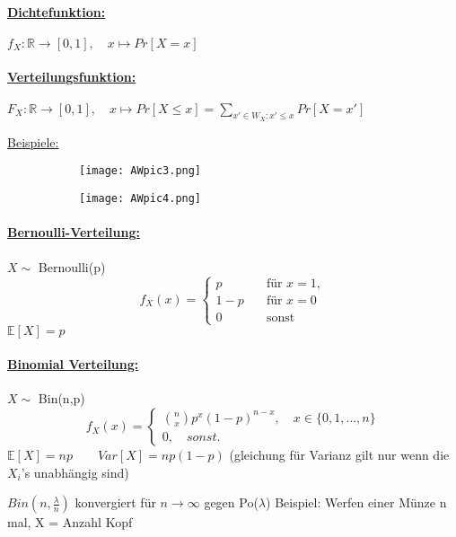 \documentclass[8pt]{extreport}
\begin{document}
 \paragraph{\underline{Dichtefunktion:}}
\begin{center}
$f_X:\mathbb{R} \rightarrow [0,1], \quad x \mapsto Pr[X = x]$
\end{center}
\paragraph{\underline{Verteilungsfunktion:}}
\begin{center}
$F_X : \mathbb{R} \rightarrow [0,1], \quad x \mapsto Pr[X \leq x] = \displaystyle\sum_{x' \in W_{X}: x' \leq x} Pr[X = x']$
\end{center}
\underline{Beispiele:}
\begin{figure}[h!]
	\centering
	\begin{subfigure}[b]{0.4\linewidth}
	\texttt{[image: AWpic3.png]}
	\caption{}
	\label{ziehungsmoglichkeiten}
	\end{subfigure}
	\begin{subfigure}[b]{0.4\linewidth}
	\texttt{[image: AWpic4.png]}
	\caption{}
	\label{ziehungsmoglichkeiten}
	\end{subfigure}

\end{figure}
\newpage

\paragraph{\underline{Bernoulli-Verteilung:}}
\begin{center}
$X \sim$ Bernoulli(p)\\
\[ f_X(x) =
  \begin{cases}
    p       & \quad \text{für } x = 1,\\
    1-p  & \quad \text{für } x=0\\
    0 & \quad \text{sonst}
  \end{cases}
\]
$\mathbb{E}[X] = p$ 
\end{center}
\paragraph{\underline{Binomial Verteilung:}}
\begin{center}
$ X \sim$ Bin(n,p)\\
\[ f_X(x) =
\begin{cases}
\binom{n}{x}p^x(1-p)^{n-x}, \quad x \in \{0,1,\dots, n\}\\
0, \quad sonst.
\end{cases}
\]
$\mathbb{E}[X] = np \qquad Var[X] = np(1-p)$ (gleichung für Varianz gilt nur wenn die $X_i$'s unabhängig sind)
\end{center}
$Bin(n,\frac{\lambda}{n})$ konvergiert für $n\to \infty$ gegen Po($\lambda$)
Beispiel: Werfen einer Münze n mal, X = Anzahl Kopf
\end{document}
